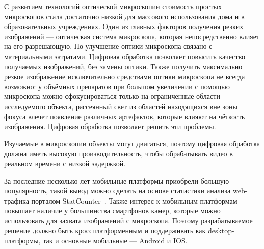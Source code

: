 \documentclass[14pt]{matmex-diploma-custom}
\begin{document}
С развитием технологий оптической микроскопии стоимость простых микроскопов стала достаточно низкой для массового использования дома и в образовательных учреждениях. Один из главных факторов получения резких изображений --- оптическая система микроскопа, которая непосредственно влияет на его разрешающую. Но улучшение оптики микроскопа связано с материальными затратами. Цифровая обработка позволяет повысить качество получаемых изображений, без замены оптики. Также получить максимально резкое изображение исключительно средствами оптики микроскопа не всегда возможно: у объёмных препаратов при большом увеличении с помощью микроскопа можно сфокусироваться только на ограниченные области исследуемого объекта, рассеянный свет из областей находящихся вне зоны фокуса влечет появление различных артефактов, которые влияют на чёткость изображения. Цифровая обработка позволяет решить эти проблемы.
\par
Изучаемые в микроскопии объекты могут двигаться, поэтому цифровая обработка должна иметь высокую производительность, чтобы обрабатывать видео в реальном времени с низкой задержкой.
\par
За последние несколько лет мобильные платформы приобрели большую популярность, такой вывод можно сделать на основе статистики анализа web-трафика порталом StatCounter~\cite{StatCounter}. Также интерес к мобильным платформам повышает наличие у большинства смартфонов камер, которые можно использовать для захвата изображений с микроскопа. Поэтому разрабатываемое решение должно быть кроссплатформенным и поддерживать как desktop-платформы, так и основные мобильные --- Android и IOS.

\end{document}
